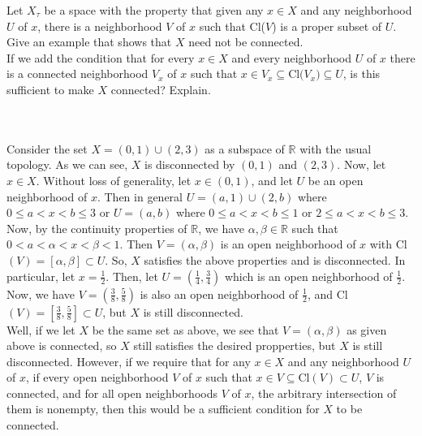 Let $X_{\tau}$ be a space with the property that given any $x\in X$ and any neighborhood $U$ of $x$,
there is a neighborhood $V$ of $x$ such that Cl($V$) is a proper subset of $U$.\\
Give an example that shows that $X$ need not be connected.\\
If we add the condition that for every $x\in X$ and every neighborhood $U$ of $x$ there is a connected
neighborhood $V_x$ of $x$ such that $x\in V_x\subseteq \text{Cl($V_x$)}\subseteq U$, is this sufficient
to make $X$ connected? Explain.\\\\

\begin{solution}\renewcommand{\qedsymbol}{}\ \\
    Consider the set $X=(0,1)\cup(2,3)$ as a subspace of $\mathbb{R}$ with the usual topology. As we can
    see, $X$ is disconnected by $(0,1)$ and $(2,3)$. Now, let $x\in X$. Without loss of generality, let
    $x\in(0,1)$, and let $U$ be an open neighborhood of $x$. Then in general $U=(a,1)\cup(2,b)$ where
    $0\leq a<x<b\leq3$ or $U=(a,b)$ where $0\leq a<x<b\leq1$ or $2\leq a<x<b\leq3$. Now, by the
    continuity properties of $\mathbb{R}$, we have $\alpha,\beta\in\mathbb{R}$ such that
    $0<a<\alpha<x<\beta<1$. Then $V=(\alpha,\beta)$ is an open neighborhood of $x$ with
    Cl$(V)=[\alpha,\beta]\subset U$. So, $X$ satisfies the above properties and is disconnected. In
    particular, let $x=\frac12$. Then, let $U=(\frac14,\frac34)$ which is an open neighborhood of
    $\frac12$. Now, we have $V=(\frac38,\frac58)$ is also an open neighborhood of $\frac12$, and
    Cl$(V)=[\frac38,\frac58]\subset U$, but $X$ is still disconnected.\\

    Well, if we let $X$ be the same set as above, we see that $V=(\alpha,\beta)$ as given above is
    connected, so $X$ still satisfies the desired propperties, but $X$ is still disconnected. However,
    if we require that for any $x\in X$ and any neighborhood $U$ of $x$, if every open neighborhood $V$
    of $x$ such that $x\in V\subseteq$Cl$(V)\subset U$, $V$ is connected, and for all open neighborhoods
    $V$ of $x$, the arbitrary intersection of them is nonempty, then this would be a sufficient
    condition for $X$ to be connected.

\end{solution}
